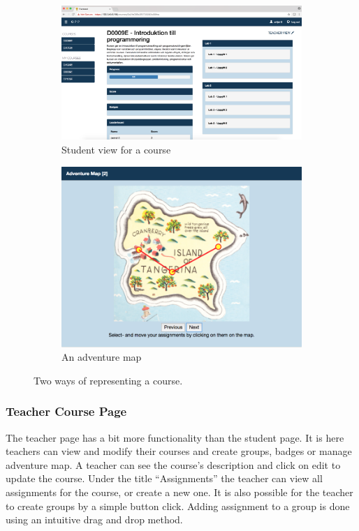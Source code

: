 \begin{figure}[H]
    \begin{subfigure}{.48\linewidth}
        \centering
        \includegraphics[width=\textwidth]{img/gppinpictures/studentview.png}
        \caption{Student view for a course}
        \label{fig:course_student_view}
    \end{subfigure}
    \hfill
    \begin{subfigure}{.48\linewidth}
        \centering
        \includegraphics[width=\textwidth]{img/gppinpictures/adventuremap.png}
        \caption{An adventure map}
        \label{fig:adventure_map}
    \end{subfigure}
    \caption{Two ways of representing a course.}
\end{figure}

\subsubsection{Teacher Course Page}
The teacher page has a bit more functionality than the student page. It is here teachers can view and modify their courses and create groups, badges or manage adventure map. A teacher can see the course's description and click on edit to update the course. Under the title ``Assignments'' the teacher can view all assignments for the course, or create a new one. It is also possible for the teacher to create groups by a simple button click. Adding assignment to a group is done using an intuitive drag and drop method. 

